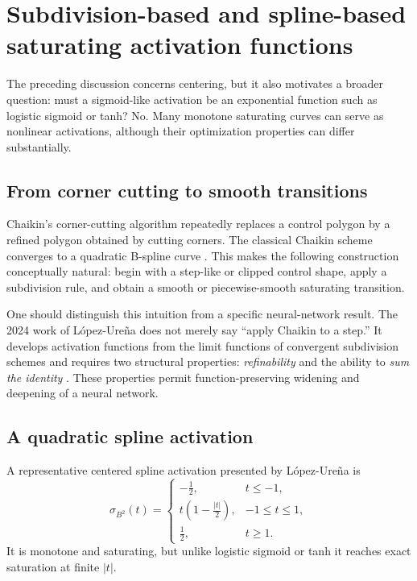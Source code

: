 \documentclass[11pt]{article}
\begin{document}
\appendix

\section{Subdivision-based and spline-based saturating activation functions}
\label{app:subdivision}

The preceding discussion concerns centering, but it also motivates a broader question: must a sigmoid-like activation be an exponential function such as logistic sigmoid or tanh?  No.  Many monotone saturating curves can serve as nonlinear activations, although their optimization properties can differ substantially.

\subsection{From corner cutting to smooth transitions}

Chaikin's corner-cutting algorithm repeatedly replaces a control polygon by a refined polygon obtained by cutting corners.  The classical Chaikin scheme converges to a quadratic B-spline curve \cite{chaikin1974,caltechchaikin}.  This makes the following construction conceptually natural: begin with a step-like or clipped control shape, apply a subdivision rule, and obtain a smooth or piecewise-smooth saturating transition.

One should distinguish this intuition from a specific neural-network result.  The 2024 work of L\'opez-Ure\~na does not merely say ``apply Chaikin to a step.''  It develops activation functions from the limit functions of convergent subdivision schemes and requires two structural properties: \emph{refinability} and the ability to \emph{sum the identity} \cite{lopezurena2024}.  These properties permit function-preserving widening and deepening of a neural network.

\subsection{A quadratic spline activation}

A representative centered spline activation presented by L\'opez-Ure\~na is
\begin{equation}
\sigma_{B^2}(t)=
\begin{cases}
-\frac12, & t\le -1,\\[4pt]
 t\left(1-\frac{|t|}{2}\right), & -1\le t\le 1,\\[4pt]
 \frac12, & t\ge 1.
\end{cases}
\label{eq:splineact}
\end{equation}
It is monotone and saturating, but unlike logistic sigmoid or tanh it reaches exact saturation at finite \(|t|\).
\end{document}
